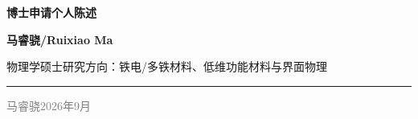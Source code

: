 \documentclass[11pt,a4paper]{article}
\newcommand{\ApplicantName}{马睿骁}
\newcommand{\EnglishName}{Ruixiao Ma}
\newcommand{\CurrentMajor}{物理学硕士}
\newcommand{\TargetField}{铁电/多铁材料、低维功能材料与界面物理}
\begin{document}
\begin{center}
  {\sffamily\fontsize{22}{26}\selectfont\bfseries\color{StatementNavy} 博士申请个人陈述}\par
  \vspace{0.35em}
  {\sffamily\large\bfseries\color{StatementTeal}\ApplicantName\enskip /\enskip \EnglishName}\par
  \vspace{0.25em}
  {\sffamily\small \CurrentMajor\enskip\textperiodcentered\enskip 研究方向：\TargetField}\par
  \vspace{0.6em}
  {\color{StatementGold}\rule{\linewidth}{1.1pt}}
\end{center}
\vspace{0.35em}



\vfill
\begin{flushright}
\sffamily\small\textcolor{gray}{\ApplicantName\quad 2026年9月}
\end{flushright}
\end{document}
